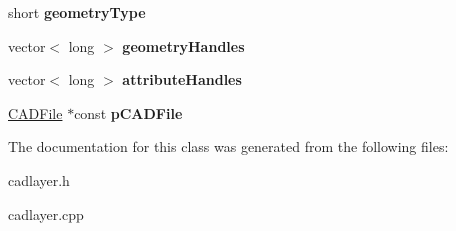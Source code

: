 \begin{DoxyCompactItemize}
\item 
short {\bfseries geometry\+Type}\hypertarget{class_c_a_d_layer_a3d9b70a9eb88b5cf23011b58077d1951}{}\label{class_c_a_d_layer_a3d9b70a9eb88b5cf23011b58077d1951}

\item 
vector$<$ long $>$ {\bfseries geometry\+Handles}\hypertarget{class_c_a_d_layer_adee3d1116628797ae976f57fb1b874f4}{}\label{class_c_a_d_layer_adee3d1116628797ae976f57fb1b874f4}

\item 
vector$<$ long $>$ {\bfseries attribute\+Handles}\hypertarget{class_c_a_d_layer_ad9fb5d0e8710b2f6bf4554c4da6f013b}{}\label{class_c_a_d_layer_ad9fb5d0e8710b2f6bf4554c4da6f013b}

\item 
\hyperlink{class_c_a_d_file}{C\+A\+D\+File} $\ast$const {\bfseries p\+C\+A\+D\+File}\hypertarget{class_c_a_d_layer_aae8a4ce8ab88ce7263dc2d483e8e9253}{}\label{class_c_a_d_layer_aae8a4ce8ab88ce7263dc2d483e8e9253}

\end{DoxyCompactItemize}


The documentation for this class was generated from the following files\+:\begin{DoxyCompactItemize}
\item 
cadlayer.\+h\item 
cadlayer.\+cpp\end{DoxyCompactItemize}
